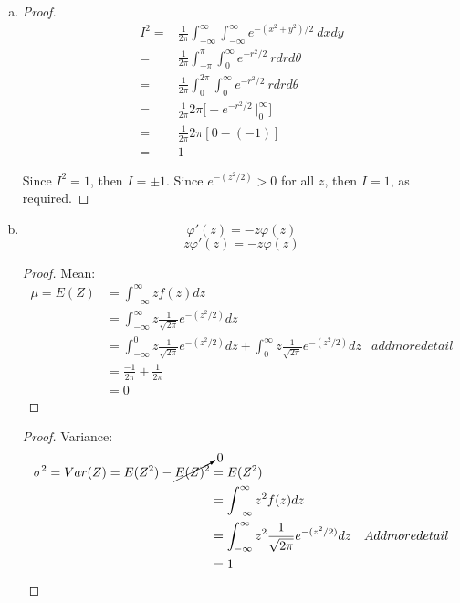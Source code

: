 \documentclass[11pt]{extarticle}
\begin{document}
\begin{enumerate}[(a)]
\item \begin{proof} \begin{align*}
I^2  = & \frac{1}{2\pi} \int_{-\infty}^{\infty} \int_{-\infty}^{\infty} e^{-(x^2 + y^2)/2}\ dxdy \\
 =& \frac{1}{2\pi} \int_{-\pi}^{\pi} \int_{0}^{\infty} e^{-r^2/2}\ r dr d\theta  \\
  =& \frac{1}{2\pi} \int_{0}^{2\pi} \int_{0}^{\infty} e^{-r^2/2}\ r dr d\theta \\
  =& \frac{1}{2\pi} 2\pi  \Big[ -e^{-r^2/2}\ \Big|_0^\infty \Big] \\
  =& \frac{1}{2\pi} 2\pi [0 - (-1)] \\
  =& 1
\end{align*}


Since $I^2 = 1$, then $I = \pm 1$. Since $e^{-(z^2/2)} > 0$ for all $z$, then $I=1$, as required. \end{proof}

\item $$\varphi'(z) = -z \varphi(z) $$ $$z \varphi'(z) = -z \varphi(z) $$

\begin{proof} Mean: \begin{align*} \mu = E(Z) & = \int_{-\infty}^{\infty} z f(z) dz \\
& =  \int_{-\infty}^{\infty} z \frac{1}{\sqrt{2 \pi}} e^{-(z^2/2)} dz\\
& =  \int_{-\infty}^{0} z \frac{1}{\sqrt{2 \pi}} e^{-(z^2/2)} dz + \int_{0}^{\infty} z \frac{1} {\sqrt{2 \pi}} e^{-(z^2/2)} dz & add more detail\\
& = \frac{-1}{2\pi} + \frac{1}{2\pi}\\
& =  0 \end{align*} \end{proof}

\begin{proof} Variance: \begin{align*} \sigma^2 = Var(Z) =  E(Z^2) - \cancelto{0}{E(Z)^2} & = E(Z^2) \\
& =  \int_{-\infty}^{\infty} z^2 f(z) dz\\
& =  \int_{-\infty}^{\infty} z^2 \frac{1}{\sqrt{2 \pi}} e^{-(z^2/2)} dz & Add more detail\\
& =  1 \end{align*} \end{proof}


\end{enumerate}
\end{document}
